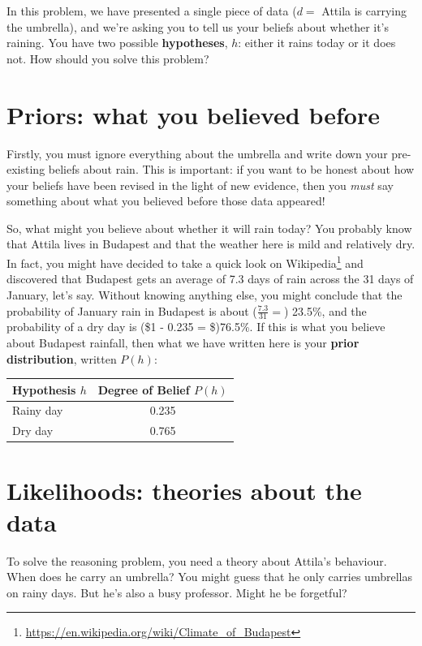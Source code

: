 \documentclass[
  11pt,
  a4paper,
  twoside,symmetric,openright]{book}
\theoremstyle{break}
\theoremstyle{break}
\begin{document}
In this problem, we have presented a single piece of data (\(d =\) Attila is carrying the umbrella), and we're asking you to tell us your beliefs about whether it's raining. You have two possible \textbf{hypotheses}, \(h\): either it rains today or it does not. How should you solve this problem?

\section{Priors: what you believed before}\label{priors-what-you-believed-before}

Firstly, you must ignore everything about the umbrella and write down your pre-existing beliefs about rain. This is important: if you want to be honest about how your beliefs have been revised in the light of new evidence, then you \emph{must} say something about what you believed before those data appeared!

So, what might you believe about whether it will rain today? You probably know that Attila lives in Budapest and that the weather here is mild and relatively dry. In fact, you might have decided to take a quick look on Wikipedia\footnote{\url{https://en.wikipedia.org/wiki/Climate_of_Budapest}} and discovered that Budapest gets an average of 7.3 days of rain across the 31 days of January, let's say. Without knowing anything else, you might conclude that the probability of January rain in Budapest is about (\(\frac{7.3}{31}=\)) 23.5\%, and the probability of a dry day is (\$1 - 0.235 = \$)76.5\%. If this is what you believe about Budapest rainfall, then what we have written here is your \textbf{prior distribution}, written \(P(h)\):

\begin{longtable}[]{@{}lc@{}}
\toprule\noalign{}
Hypothesis \(h\) & Degree of Belief \(P(h)\) \\
\midrule\noalign{}
\endhead
\bottomrule\noalign{}
\endlastfoot
Rainy day & 0.235 \\
Dry day & 0.765 \\
\end{longtable}

\section{Likelihoods: theories about the data}\label{likelihoods-theories-about-the-data}

To solve the reasoning problem, you need a theory about Attila's behaviour. When does he carry an umbrella? You might guess that he only carries umbrellas on rainy days. But he's also a busy professor. Might he be forgetful?
\end{document}
